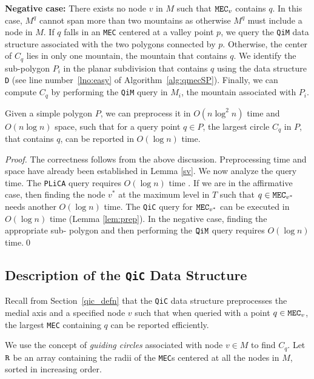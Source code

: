 \documentclass[12pt]{llncs}
\begin{document}
{\bf Negative case:} There exists no node $v$ in $M$ such that ${\tt MEC}_v$ 
contains $q$. In this case, $M^q$ cannot span more than two  mountains as 
otherwise $M^q$ must include a node in $M$. If $q$ falls in an {\tt MEC} centered at a valley point $p$, we 
query the {\tt QiM} data structure associated with the two polygons connected by $p$. 
Otherwise, 
the center of $C_q$ lies in only one mountain, the mountain that 
contains $q$. We identify the sub-polygon $P_i$  in the planar subdivision that 
contains $q$ using the data structure {\tt D} (see line number\ \ref{lno:easy} of 
Algorithm\ \ref{alg:qmecSP}). Finally, we can compute 
$C_q$ by performing the {\tt QiM} query in $M_i$, the mountain associated with $P_i
$.
 
 
 

\begin{theorem} \label{th:th}
Given a simple polygon $P$, we can preprocess it in $O(n\log^2 n)$ time and 
$O(n\log n)$ space, such that for a query point $q\in P$, the largest circle 
$C_q$ in $P$, that contains $q$, can be reported in $O(\log n)$ time. 
\end{theorem}
\begin{proof}
The correctness follows from the above discussion.
Preprocessing time and space have already been established in Lemma \ref{sv}.
We now analyze the  query time. The {\tt PLiCA} query requires $O(\log n)$ time 
\cite{IIM}. If we are in the affirmative case, then finding the node $v^*$ 
at the maximum level in $T$ such that $q \in {\tt MEC}_{v^*}$ needs another 
$O(\log n)$ time. The {\tt QiC} query for ${\tt MEC}_{v^*}$ can be executed in $O(\log n)$ 
time (Lemma \ref{lem:prep}). In the negative case, finding the appropriate sub-
polygon 
and then performing the ${\tt QiM}$ query requires $O(\log n)$ time.\qed
\end{proof}


\vspace{-0.15in}
\subsection{Description of the {\tt QiC} Data Structure}\label{subsec:QiC}
Recall from Section\ \ref{qic_defn} that  the {\tt QiC} data structure preprocesses  the 
medial axis and a specified node $v$ such that when queried with a point $q \in {\tt 
MEC}_v$, the largest {\tt MEC} containing $q$ can be reported efficiently.  

We use the concept of {\it guiding circles} associated with node $v\in M$ to find $C_q
$.
Let ${\tt R}$ be an array containing the radii of the {\tt MEC}s centered at all the 
nodes 
in $M$, sorted in increasing order.
\end{document}
